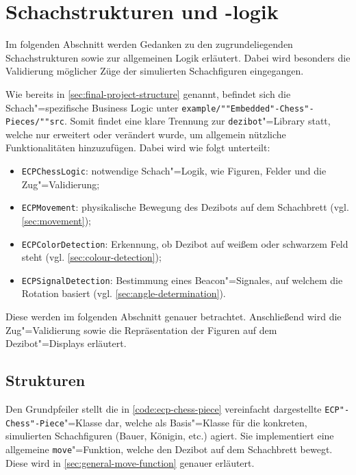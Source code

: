
\section{Schachstrukturen und -logik}
\label{sec:chess-logic}

Im folgenden Abschnitt werden Gedanken zu den zugrundeliegenden Schachstrukturen sowie zur allgemeinen Logik erläutert. Dabei wird besonders die Validierung möglicher Züge der simulierten Schachfiguren eingegangen.

Wie bereits in \autoref{sec:final-project-structure} genannt, befindet sich die Schach"=spezifische Business Logic unter \texttt{example/""Embedded"-Chess"-Pieces/""src}. Somit findet eine klare Trennung zur \texttt{dezibot}"=Library statt, welche nur erweitert oder verändert wurde, um allgemein nützliche Funktionalitäten hinzuzufügen. Dabei wird wie folgt unterteilt:

\begin{itemize}
    \item \texttt{ECPChessLogic}: notwendige Schach"=Logik, wie Figuren, Felder und die Zug"=Validierung;
    \item \texttt{ECPMovement}: physikalische Bewegung des Dezibots auf dem Schachbrett (vgl. \autoref{sec:movement});
    \item \texttt{ECPColorDetection}: Erkennung, ob Dezibot auf weißem oder schwarzem Feld steht (vgl. \autoref{sec:colour-detection});
    \item \texttt{ECPSignalDetection}: Bestimmung eines Beacon"=Signales, auf welchem die Rotation basiert (vgl. \autoref{sec:angle-determination}).
\end{itemize}

Diese werden im folgenden Abschnitt genauer betrachtet. Anschließend wird die Zug"=Validierung sowie die Repräsentation der Figuren auf dem Dezibot"=Displays erläutert.


\subsection{Strukturen}


Den Grundpfeiler stellt die in \autoref{code:ecp-chess-piece} vereinfacht dargestellte \texttt{ECP"-Chess"-Piece}"=Klasse dar, welche als Basis"=Klasse für die konkreten, simulierten Schachfiguren (Bauer, Königin, etc.) agiert. Sie implementiert eine allgemeine \texttt{move}"=Funktion, welche den Dezibot auf dem Schachbrett bewegt. Diese wird in \autoref{sec:general-move-function} genauer erläutert.

